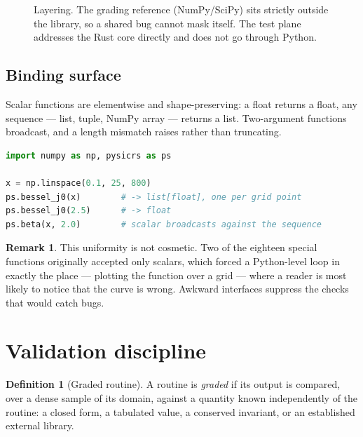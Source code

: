 \documentclass[11pt,a4paper]{article}
\theoremstyle{plain}
\theoremstyle{definition}
\newtheorem{definition}[theorem]{Definition}
\newtheorem{remark}[theorem]{Remark}
\begin{document}
\begin{figure}[h]
\caption{Layering. The grading reference (NumPy/SciPy) sits strictly outside the
library, so a shared bug cannot mask itself. The test plane addresses the Rust
core directly and does not go through Python.}
\label{fig:arch}
\end{figure}

\subsection{Binding surface}

Scalar functions are elementwise and shape-preserving: a float returns a float,
any sequence --- list, tuple, NumPy array --- returns a list. Two-argument
functions broadcast, and a length mismatch raises rather than truncating.

\begin{lstlisting}[language=Python]
import numpy as np, pysicrs as ps

x = np.linspace(0.1, 25, 800)
ps.bessel_j0(x)        # -> list[float], one per grid point
ps.bessel_j0(2.5)      # -> float
ps.beta(x, 2.0)        # scalar broadcasts against the sequence
\end{lstlisting}

\begin{remark}
This uniformity is not cosmetic. Two of the eighteen special functions
originally accepted only scalars, which forced a Python-level loop in exactly
the place --- plotting the function over a grid --- where a reader is most likely
to notice that the curve is wrong. Awkward interfaces suppress the checks that
would catch bugs.
\end{remark}

\section{Validation discipline}\label{sec:validation}

\begin{definition}[Graded routine]
A routine is \emph{graded} if its output is compared, over a dense sample of its
domain, against a quantity known independently of the routine: a closed form, a
tabulated value, a conserved invariant, or an established external library.
\end{definition}
\end{document}
